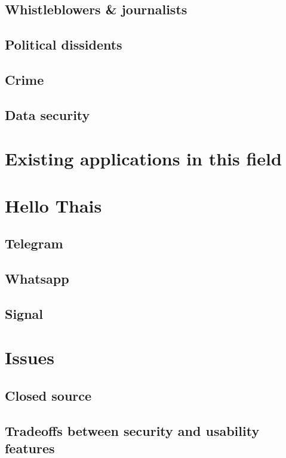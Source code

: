 \documentclass{mproj}
\begin{document}
\subsection{Whistleblowers \& journalists}

\subsection{Political dissidents}

\subsection{Crime}

\subsection{Data security}

\section{Existing applications in this field}
\section{Hello Thais}
\subsection{Telegram}

\subsection{Whatsapp}
\subsection{Signal}

\section{Issues}

\subsection{Closed source}

\subsection{Tradeoffs between security and usability features}
\end{document}
